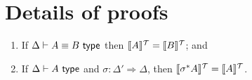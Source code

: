 \section{Details of proofs}


\begin{restateLemma}
  \begin{enumerate}
  \item If $\Delta \vdash A \equiv B \textsf{ type}$ then $\llbracket A \rrbracket^{\mathcal{T}} =
    \llbracket B \rrbracket^{\mathcal{T}}$; and
  \item If $\Delta \vdash A \textsf{ type}$ and $\sigma : \Delta' \Rightarrow
    \Delta$, then $\llbracket \sigma^*A \rrbracket^{\mathcal{T}} = \llbracket A \rrbracket^{\mathcal{T}}$.
  \end{enumerate}
\end{restateLemma}

